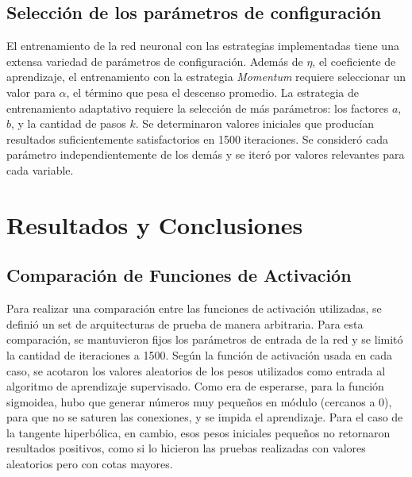 \documentclass[a4paper,10pt]{article}
\begin{document}
    \subsection{Selección de los parámetros de configuración}

        \label{sec:configuracion}
        El entrenamiento de la red neuronal con las estrategias implementadas tiene una extensa variedad de parámetros de configuración. Además de $\eta$, 
        el coeficiente de aprendizaje, el entrenamiento con la estrategia \textit{Momentum} requiere seleccionar un valor para $\alpha$, el término que pesa el descenso promedio. 
        La estrategia de entrenamiento adaptativo requiere la selección de más parámetros: los factores $a$, $b$, y la cantidad de pasos $k$.
        Se determinaron valores iniciales que producían resultados suficientemente satisfactorios en 1500 iteraciones. Se consideró cada parámetro independientemente de los demás y se iteró por valores relevantes para cada variable.

\section{Resultados y Conclusiones}

    \subsection{Comparación de Funciones de Activación}
    \label{sec:comparacion-activacion}

    Para realizar una comparación entre las funciones de activación utilizadas,
    se definió un set de arquitecturas de prueba de manera arbitraria.
    Para esta comparación, se mantuvieron fijos los parámetros de entrada de la
    red y se limitó la cantidad de iteraciones a 1500.
    Según la función de activación usada en cada caso, se acotaron los valores
    aleatorios de los pesos utilizados como entrada al algoritmo de aprendizaje
    supervisado. Como era de esperarse, para la función sigmoidea, hubo que
    generar números muy pequeños en módulo (cercanos a 0), para que no se saturen
    las conexiones, y se impida el aprendizaje.
    Para el caso de la tangente hiperbólica, en cambio, esos pesos iniciales
    pequeños no retornaron resultados positivos, como si lo hicieron las pruebas
    realizadas con valores aleatorios pero con cotas mayores.
\end{document}
